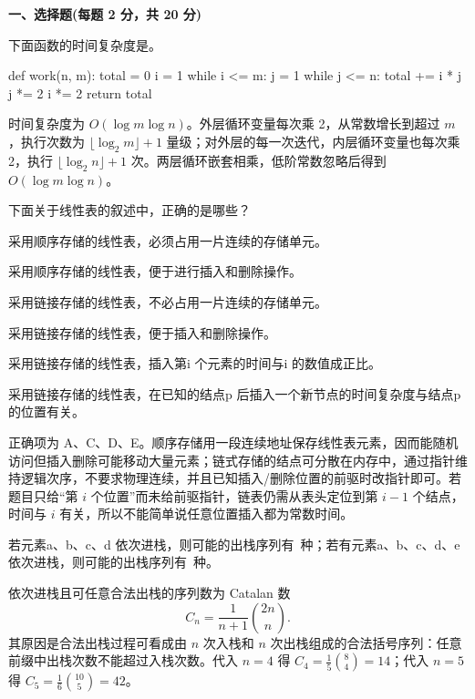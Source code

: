 

\textbf{一、选择题(每题 2 分，共 20 分)}
\begin{question}
下面函数的时间复杂度是\blank。
\begin{pycode}
def work(n, m):
    total = 0
    i = 1
    while i <= m:
        j = 1
        while j <= n:
            total += i * j
            j *= 2
        i *= 2
    return total
\end{pycode}
\begin{solution}
时间复杂度为 $O(\log m\log n)$。外层循环变量每次乘 2，从常数增长到超过 $m$，执行次数为 $\lfloor\log_2 m\rfloor+1$ 量级；对外层的每一次迭代，内层循环变量也每次乘 2，执行 $\lfloor\log_2 n\rfloor+1$ 次。两层循环嵌套相乘，低阶常数忽略后得到 $O(\log m\log n)$。
\end{solution}
\end{question}

\begin{question}
下面关于线性表的叙述中，正确的是哪些？
\begin{choiceoptions}[1]
  \item 采用顺序存储的线性表，必须占用一片连续的存储单元。
  \item 采用顺序存储的线性表，便于进行插入和删除操作。
  \item 采用链接存储的线性表，不必占用一片连续的存储单元。
  \item 采用链接存储的线性表，便于插入和删除操作。
  \item 采用链接存储的线性表，插入第i 个元素的时间与i 的数值成正比。
  \item 采用链接存储的线性表，在已知的结点p 后插入一个新节点的时间复杂度与结点p 的位置有关。
\end{choiceoptions}
\begin{solution}
正确项为 A、C、D、E。顺序存储用一段连续地址保存线性表元素，因而能随机访问但插入删除可能移动大量元素；链式存储的结点可分散在内存中，通过指针维持逻辑次序，不要求物理连续，并且已知插入/删除位置的前驱时改指针即可。若题目只给“第 $i$ 个位置”而未给前驱指针，链表仍需从表头定位到第 $i-1$ 个结点，时间与 $i$ 有关，所以不能简单说任意位置插入都为常数时间。
\end{solution}
\end{question}

\begin{question}
若元素a、b、c、d 依次进栈，则可能的出栈序列有\blank\ 种；若有元素a、b、c、d、e 依次进栈，则可能的出栈序列有\blank\ 种。
\begin{solution}
依次进栈且可任意合法出栈的序列数为 Catalan 数
\[
C_n=\frac{1}{n+1}\binom{2n}{n}.
\]
其原因是合法出栈过程可看成由 $n$ 次入栈和 $n$ 次出栈组成的合法括号序列：任意前缀中出栈次数不能超过入栈次数。代入 $n=4$ 得 $C_4=\frac15\binom84=14$；代入 $n=5$ 得 $C_5=\frac16\binom{10}{5}=42$。
\end{solution}
\end{question}

